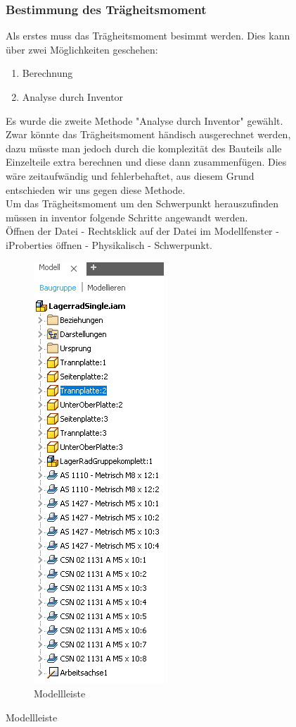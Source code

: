 \begin{figure}
\subsubsection{Bestimmung des Trägheitsmoment}

Als erstes muss das Trägheitsmoment besimmt werden. Dies kann über zwei Möglichkeiten geschehen:
\begin{enumerate}
    \item Berechnung
    \item Analyse durch Inventor
\end{enumerate}

Es wurde die zweite Methode "Analyse durch Inventor" gewählt. Zwar könnte das Trägheitsmoment händisch ausgerechnet werden,
dazu müsste man jedoch durch die komplezität des Bauteils alle Einzelteile extra berechnen und diese dann zusammenfügen.
Dies wäre zeitaufwändig und fehlerbehaftet, aus diesem Grund entschieden wir uns gegen diese Methode. \\

Um das Trägheitsmoment um den Schwerpunkt herauszufinden müssen in inventor folgende Schritte
angewandt werden.\\
Öffnen der Datei - Rechtsklick auf der Datei im Modellfenster - iProberties öffnen - Physikalisch -  Schwerpunkt.\\
\begin{figure}[H]
    \centering
    \includegraphics[scale=1,page=1]{fig/mech/Modellleiste.PNG}
    \caption{Modellleiste}
\end{figure}



\end{figure}
